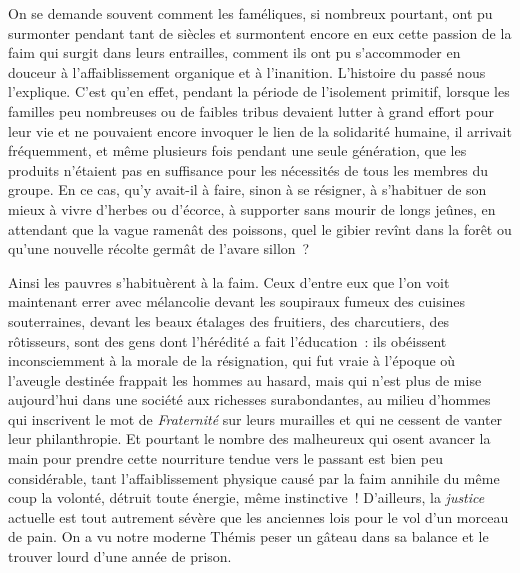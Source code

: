 \documentclass[french,twoside]{book} %
\begin{document}
On se demande souvent comment les faméliques, si nombreux pourtant, ont pu surmonter pendant tant de siècles et surmontent encore en eux cette passion de la faim qui surgit dans leurs  entrailles, comment ils ont pu s’accommoder en douceur à l’affaiblissement organique et à l’inanition. L’histoire du passé nous l’explique. C’est qu’en effet, pendant la période de l’isolement primitif, lorsque les familles peu nombreuses ou de faibles tribus devaient lutter à grand effort pour leur vie et ne pouvaient encore invoquer le lien de la solidarité humaine, il arrivait fréquemment, et même plusieurs fois pendant une seule génération, que les produits n’étaient pas en suffisance pour les nécessités de tous les membres du groupe. En ce cas, qu’y avait-il à faire, sinon à se résigner, à s’habituer de son mieux à vivre d’herbes ou d’écorce, à supporter sans mourir de longs jeûnes, en attendant que la vague ramenât des poissons,  quel le gibier revînt dans la forêt ou qu’une nouvelle récolte germât de l’avare sillon ?\par
Ainsi les pauvres s’habituèrent à la faim. Ceux d’entre eux que l’on voit maintenant errer avec mélancolie devant les soupiraux fumeux des cuisines souterraines, devant les beaux étalages des fruitiers, des charcutiers, des rôtisseurs, sont des gens dont l’hérédité a fait l’éducation : ils obéissent inconsciemment à la morale de la résignation, qui fut vraie à l’époque où l’aveugle destinée frappait les hommes au hasard, mais qui n’est plus de mise aujourd’hui dans une société aux richesses surabondantes, au milieu d’hommes qui inscrivent le mot de \emph{Fraternité} sur leurs murailles et qui ne cessent de vanter leur  philanthropie. Et pourtant le nombre des malheureux qui osent avancer la main pour prendre cette nourriture tendue vers le passant est bien peu considérable, tant l’affaiblissement physique causé par la faim annihile du même coup la volonté, détruit toute énergie, même instinctive ! D’ailleurs, la \emph{justice} actuelle est tout autrement sévère que les anciennes lois pour le vol d’un morceau de pain. On a vu notre moderne Thémis peser un gâteau dans sa balance et le trouver lourd d’une année de prison.\par
\end{document}
